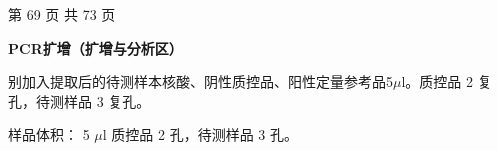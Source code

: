 \documentclass[UTF8,10pt,a4paper,fontset=fandol]{ctexart}
\newcommand{\fieldvalue}[1]{#1}
\newcommand{\handwritten}[1]{#1}
\begin{document}
\begin{center}
第 69 页 共 73 页
\end{center}

\newpage

\begin{center}
\textbf{PCR扩增（扩增与分析区）}
\end{center}

\noindent
别加入提取后的待测样本核酸、阴性质控品、阳性定量参考品5$\mu$l。质控品
\fieldvalue{\handwritten{2}}
复孔，待测样品
\fieldvalue{\handwritten{3}}
复孔。

\noindent
样品体积：
\fieldvalue{\handwritten{5}}
$\mu$l\qquad
质控品
\fieldvalue{\handwritten{2}}
孔，待测样品
\fieldvalue{\handwritten{3}}
孔。
\end{document}
